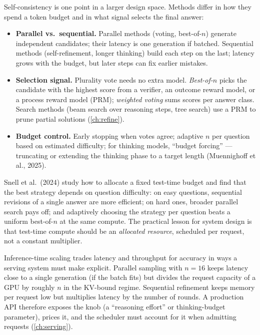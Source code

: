 Self-consistency is one point in a larger design space. Methods differ in how they spend a token
budget and in what signal selects the final answer:

\begin{itemize}
  \item \textbf{Parallel vs.\ sequential.} Parallel methods (voting, best-of-$n$) generate
  independent candidates; their latency is one generation if batched. Sequential methods
  (self-refinement, longer thinking) build each step on the last; latency grows with the budget,
  but later steps can fix earlier mistakes.
  \item \textbf{Selection signal.} Plurality vote needs no extra model. \emph{Best-of-$n$} picks the
  candidate with the highest score from a verifier, an outcome reward model, or a process reward
  model (PRM); \emph{weighted voting} sums scores per answer class. Search methods (beam search over
  reasoning steps, tree search) use a PRM to prune partial solutions (\cref{ch:refine}).
  \item \textbf{Budget control.} Early stopping when votes agree; adaptive $n$ per question based
  on estimated difficulty; for thinking models, ``budget forcing'' --- truncating or extending the
  thinking phase to a target length (Muennighoff et al., 2025).
\end{itemize}

Snell et al.\ (2024) study how to allocate a fixed test-time budget and find that the best strategy
depends on question difficulty: on easy questions, sequential revisions of a single answer are more
efficient; on hard ones, broader parallel search pays off; and adaptively choosing the strategy per
question beats a uniform best-of-$n$ at the same compute. The practical lesson for system design is
that test-time compute should be an \emph{allocated resource}, scheduled per request, not a
constant multiplier.

\begin{systemslens}
Inference-time scaling trades latency and throughput for accuracy in ways a serving system must
make explicit. Parallel sampling with $n=16$ keeps latency close to a single generation (if the
batch fits) but divides the request capacity of a GPU by roughly $n$ in the KV-bound regime.
Sequential refinement keeps memory per request low but multiplies latency by the number of rounds.
A production API therefore exposes the knob (a ``reasoning effort'' or thinking-budget parameter),
prices it, and the scheduler must account for it when admitting requests (\cref{ch:serving}).
\end{systemslens}

